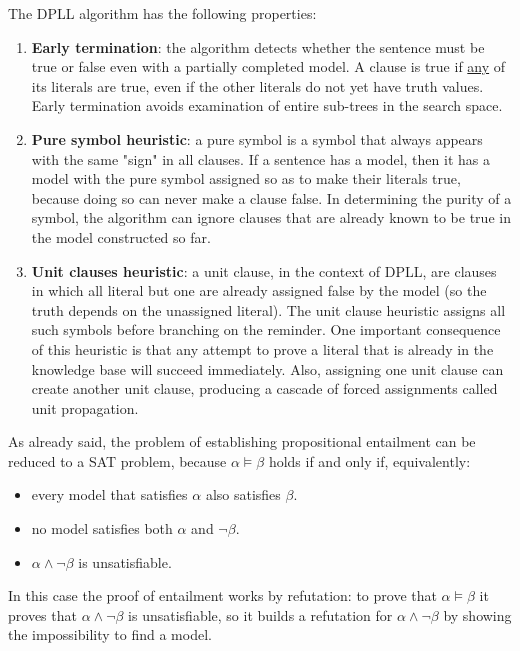 \documentclass{article}
\begin{document}
\noindent The DPLL algorithm has the following properties:
\begin{enumerate}
    \item \textbf{Early termination}: the algorithm detects whether the sentence must be true or false even with a partially completed model. A clause is true if \underline{any} of its literals are true, even if the other literals do not yet have truth values. Early termination avoids examination of entire sub-trees in the search space.
    \item \textbf{Pure symbol heuristic}: a pure symbol is a symbol that always appears with the same "sign" in all clauses. If a sentence has a model, then it has a model with the pure symbol assigned so as to make their literals true, because doing so can never make a clause false. In determining the purity of a symbol, the algorithm can ignore clauses that are already known to be true in the model constructed so far.
    \item \textbf{Unit clauses heuristic}: a unit clause, in the context of DPLL, are clauses in which all literal but one are already assigned false by the model (so the truth depends on the unassigned literal). The unit clause heuristic assigns all such symbols before branching on the reminder. One important consequence of this heuristic is that any attempt to prove a literal that is already in the knowledge base will succeed immediately. Also, assigning one unit clause can create another unit clause, producing a cascade of forced assignments called unit propagation.   
\end{enumerate}

As already said, the problem of establishing propositional entailment can be reduced to a SAT problem, because $\alpha \models \beta$ holds if and only if, equivalently:
\begin{itemize}
    \item every model that satisfies $\alpha$ also satisfies $\beta$.
    \item no model satisfies both $\alpha$ and $\neg \beta$.
    \item $\alpha \land \neg \beta$ is unsatisfiable.
\end{itemize}

\noindent In this case the proof of entailment works by refutation: to prove that $\alpha \models \beta$ it proves that $\alpha \land \neg \beta$ is unsatisfiable, so it builds a refutation for $\alpha \land \neg \beta$ by showing the impossibility to find a model.  
\end{document}

